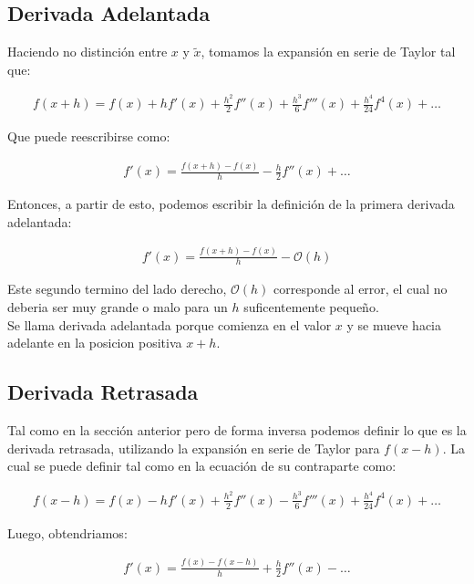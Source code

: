\documentclass[twoside]{article}
\begin{document}
  \subsection{Derivada Adelantada}
Haciendo no distinción entre $x$ y $\tilde{x}$, tomamos la expansión en serie de Taylor tal que:

\begin{align}
  f(x+h) = f(x) + h f'(x) + \frac{h^2}{2}f''(x) + \frac{h^3}{6} f'''(x) + \frac{h^4}{24}f^4(x) + \dots 
\end{align}

Que puede reescribirse como:

  \begin{align}
    f'(x) = \frac{f(x+h)-f(x)}{h} - \frac{h}{2}f''(x) + \dots
  \end{align}

Entonces, a partir de esto, podemos escribir la definición de la primera derivada adelantada:

\begin{tcolorbox}[colback=gray!20,colframe=black!40,title=Primera Derivada Adelantada]
  \begin{align}
    f' (x) = \frac{f (x+h)-f (x)}{h} - \mathcal{O} (h)
  \end{align}
\end{tcolorbox}

Este segundo termino del lado derecho, $\mathcal{O}(h)$ corresponde al error, el cual no deberia ser
muy grande o malo para un $h$ suficentemente pequeño. \\ Se llama derivada adelantada porque 
comienza en el valor $x$ y se mueve hacia adelante en la posicion positiva $x+h$.

\subsection{Derivada Retrasada}
Tal como en la sección anterior pero de forma inversa podemos definir lo que es la derivada retrasada,
utilizando la expansión en serie de Taylor para $f(x-h)$. La cual se puede definir tal como en la ecuación
de su contraparte como:

  \begin{align}
    f(x-h) = f(x) - h f'(x) + \frac{h^2}{2}f''(x) - \frac{h^3}{6} f'''(x) + \frac{h^4}{24}f^4(x) + \dots 
  \end{align}

Luego, obtendriamos:

  \begin{align}
    f'(x) = \frac{f(x)-f(x-h)}{h} + \frac{h}{2}f''(x) - \dots
  \end{align}
\end{document}
